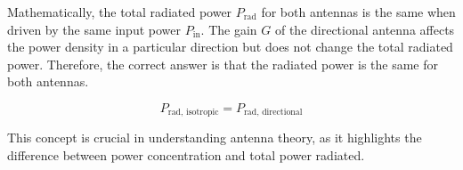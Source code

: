 Mathematically, the total radiated power \( P_{\text{rad}} \) for both antennas is the same when driven by the same input power \( P_{\text{in}} \). The gain \( G \) of the directional antenna affects the power density in a particular direction but does not change the total radiated power. Therefore, the correct answer is that the radiated power is the same for both antennas.

\[ P_{\text{rad, isotropic}} = P_{\text{rad, directional}} \]

This concept is crucial in understanding antenna theory, as it highlights the difference between power concentration and total power radiated.

